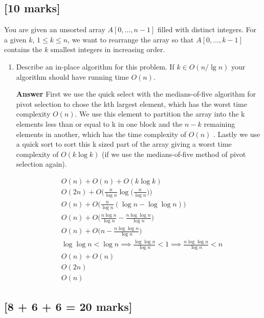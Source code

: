 \documentclass[12pt]{article}
\begin{document}
\subsection{[10 marks]}

You are given an unsorted array $A [0, \ldots, n - 1]$ filled with distinct
integers. For a given $k$, $1 \leq k \leq n$, we want to rearrange the array
so that $A [0, \ldots, k - 1]$ contains the $k$ smallest integers in
increasing order.
\begin{enumerate}
  \item Describe an in-place algorithm for this problem. If $k \in O (n / \lg
  n)$ your algorithm should have running time $O (n)$.

    \textbf{Answer} First we use the quick select with the medians-of-five algorithm for pivot selection to chose the kth largest element, which has the worst time complexity $O(n)$. We use this element to partition the array into the k elements less than or equal to k in one block and the $n-k$ remaining elements in another, which has the time complexity of $O(n)$ . Lastly we use a quick sort to sort this k sized part of the array giving a worst time complexity of $O(k\log k)$ (if we use the medians-of-five method of pivot selection again).

    \begin{align*}
      &O(n) + O(n) + O(k\log k)\\
      &O(2n) + O\bigg(\frac{n}{\log n} \log \bigg(\frac{n}{\log n}\bigg)\bigg)\\
      &O(n) + O\bigg(\frac{n}{\log n} (\log n - \log\log n)\bigg )\\
      &O(n) + O\bigg(\frac{n\log n}{\log n} - \frac{n\log\log n}{\log n}\bigg )\\
      &O(n) + O\bigg(n - \frac{n\log\log n}{\log n}\bigg )\\
      &\log\log n < \log n \implies \frac{\log\log n}{\log n} < 1 \implies \frac{n\log\log n}{\log n} < n\\
      &O(n) + O(n)\\
      &O(2n)\\
      &O(n)
    \end{align*}

\end{enumerate}

\subsection{[8 + 6 + 6 = 20 marks]}
\end{document}

